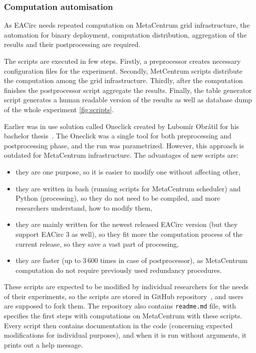 \documentclass[
  print, %
  Table,   %
  nolof,     %
  nolot,     %
  11pt, %
  oneside  %
]{fithesis3}
\begin{document}
\subsubsection{Computation automisation}
\label{subsubsec:method-spec-ss-auto}

As EACirc needs repeated computation on MetaCentrum grid infrastructure, the automation for binary deployment, computation distribution, aggregation of the results and their postprocessing are required.

The scripts are executed in few steps. Firstly, a preprocessor creates necessary configuration files for the experiment. Secondly, MetCentrum scripts distribute the computation among the grid infrastructure. Thirdly, after the computation finishes the postprocessor script aggregate the results. Finally, the table generator script generates a human readable version of the results as well as database dump of the whole experiment \cref{fig:scripts}.

Earlier was in use solution called Oneclick created by Lubomír Obrátil for his bachelor thesis~\cite{obratilBcThesis}. The Oneclick was a single tool for both preprocessing and postprocessing phase, and the run was parametrized. However, this approach is outdated for MetaCentrum infrastructure. The advantages of new scripts are: 

\begin{itemize}
    \item they are one purpose, so it is easier to modify one without affecting other,
    \item they are written in bash (running scripts for MetaCentrum scheduler) and Python (processing), so they do not need to be compiled, and more researchers understand, how to modify them,
    \item they are mainly written for the newest released EACirc version (but they support EACirc 3 as well), so they fit more the computation process of the current release, so they save a vast part of processing,
    \item they are faster (up to 3\,600 times in case of postprocessor), as MetaCentrum computation do not require previously used redundancy procedures.
\end{itemize}

These scripts are expected to be modified by individual researchers for the needs of their experiments, so the scripts are stored in GitHub repository~\cite{eaUtils}, and users are supposed to fork them. The repository also contains \texttt{readme.md} file, with specifies the first steps with computations on MetaCentrum with these scripts. Every script then contains documentation in the code (concerning expected modifications for individual purposes), and when it is run without arguments, it prints out a help message.
\end{document}
